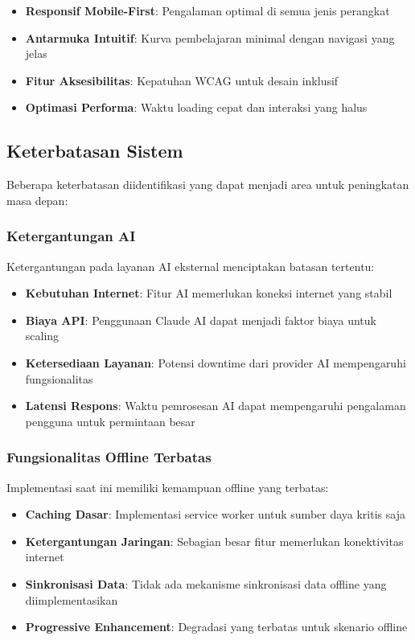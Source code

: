 \begin{itemize}
\item \textbf{Responsif Mobile-First}: Pengalaman optimal di semua jenis perangkat
\item \textbf{Antarmuka Intuitif}: Kurva pembelajaran minimal dengan navigasi yang jelas
\item \textbf{Fitur Aksesibilitas}: Kepatuhan WCAG untuk desain inklusif
\item \textbf{Optimasi Performa}: Waktu loading cepat dan interaksi yang halus
\end{itemize}

\subsection{Keterbatasan Sistem}

Beberapa keterbatasan diidentifikasi yang dapat menjadi area untuk peningkatan masa depan:

\subsubsection{Ketergantungan AI}

Ketergantungan pada layanan AI eksternal menciptakan batasan tertentu:

\begin{itemize}
\item \textbf{Kebutuhan Internet}: Fitur AI memerlukan koneksi internet yang stabil
\item \textbf{Biaya API}: Penggunaan Claude AI dapat menjadi faktor biaya untuk scaling
\item \textbf{Ketersediaan Layanan}: Potensi downtime dari provider AI mempengaruhi fungsionalitas
\item \textbf{Latensi Respons}: Waktu pemrosesan AI dapat mempengaruhi pengalaman pengguna untuk permintaan besar
\end{itemize}

\subsubsection{Fungsionalitas Offline Terbatas}

Implementasi saat ini memiliki kemampuan offline yang terbatas:

\begin{itemize}
\item \textbf{Caching Dasar}: Implementasi service worker untuk sumber daya kritis saja
\item \textbf{Ketergantungan Jaringan}: Sebagian besar fitur memerlukan konektivitas internet
\item \textbf{Sinkronisasi Data}: Tidak ada mekanisme sinkronisasi data offline yang diimplementasikan
\item \textbf{Progressive Enhancement}: Degradasi yang terbatas untuk skenario offline
\end{itemize}

